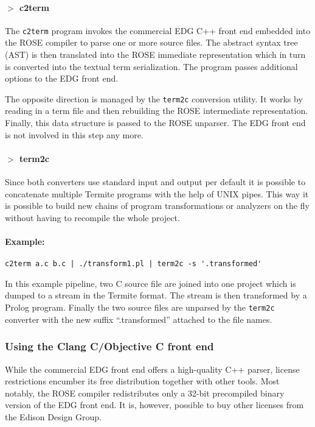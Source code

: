 \documentclass[10pt,twoside]{scrreprt}
\begin{document}
\paragraph{$>$ c2term}
The \texttt{c2term} program invokes the commercial EDG C++ front end
embedded into the ROSE compiler to parse one or more source files. The
abstract syntax tree (AST) is then translated into the ROSE immediate
representation which in turn is converted into the textual term
serialization. The program passes additional options to the EDG front
end.

The opposite direction is managed by the \texttt{term2c} conversion
utility. It works by reading in a term file and then rebuilding the
ROSE intermediate representation. Finally, this data structure is
passed to the ROSE unparser. The EDG front end is not involved in this
step any more.

\paragraph{$>$ term2c}

\bigskip

Since both converters use standard input and output per default it is
possible to concatenate multiple Termite programs with the help of
UNIX pipes. This way it is possible to build new chains of program
transformations or analyzers on the fly without having to recompile
the whole project.

\paragraph{Example:}
\begin{verbatim}
c2term a.c b.c | ./transform1.pl | term2c -s '.transformed'
\end{verbatim}
In this example pipeline, two C source file are joined into one
project which is dumped to a stream in the Termite format. The stream
is then transformed by a Prolog program. Finally the two source files
are unparsed by the \verb|term2c| converter with the new suffix
``.transformed'' attached to the file names.

\subsubsection{Using the Clang C/Objective C front end}
While the commercial EDG front end offers a high-quality C++ parser,
license restrictions encumber its free distribution together with
other tools. Most notably, the ROSE compiler redistributes only a
32-bit precompiled binary version of the EDG front end. It is,
however, possible to buy other licenses from the Edison Design Group.
\end{document}
